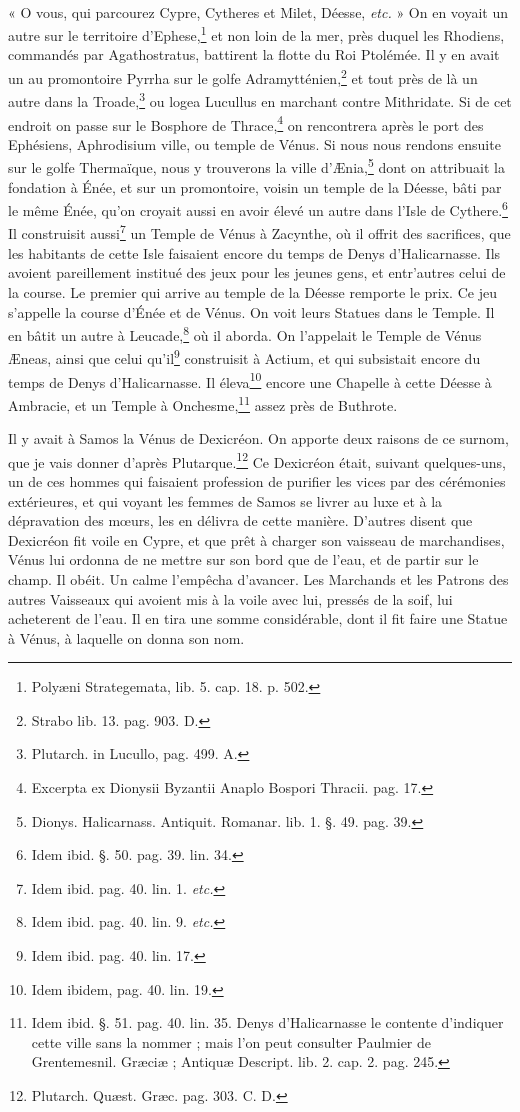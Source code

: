 \documentclass[a4paper, 18pt, oneside]{article}
\begin{document}
\paragraph{}
« O vous, qui parcourez Cypre, Cytheres et Milet, Déesse, \emph{etc.} » On en voyait un autre sur le territoire d'Ephese,\footnote{Polyæni Strategemata, lib. 5. cap. 18. p. 502.} et non loin de la mer, près duquel les Rhodiens, commandés par Agathostratus, battirent la flotte du Roi Ptolémée. Il y en avait un au promontoire Pyrrha sur le golfe Adramytténien,\footnote{Strabo lib. 13. pag. 903. D.} et tout près de là un autre dans la Troade,\footnote{Plutarch. in Lucullo, pag. 499. A.} ou logea Lucullus en marchant contre Mithridate. Si de cet endroit on passe sur le Bosphore de Thrace,\footnote{Excerpta ex Dionysii Byzantii Anaplo Bospori Thracii. pag. 17.} on rencontrera après le port des Ephésiens, Aphrodisium ville, ou temple de Vénus. Si nous nous rendons ensuite sur le golfe Thermaïque, nous y trouverons la ville d'Ænia,\footnote{Dionys. Halicarnass. Antiquit. Romanar. lib. 1. §. 49. pag. 39.} dont on attribuait la fondation à Énée, et sur un promontoire, voisin un temple de la Déesse, bâti par le même Énée, qu'on croyait aussi en avoir élevé un autre dans l'Isle de Cythere.\footnote{Idem ibid. §. 50. pag. 39. lin. 34.} Il construisit aussi\footnote{Idem ibid. pag. 40. lin. 1. \emph{etc.}} un Temple de Vénus à Zacynthe, où il offrit des sacrifices, que les habitants de cette Isle faisaient encore du temps de Denys d'Halicarnasse. Ils avoient pareillement institué des jeux pour les jeunes gens, et entr'autres celui de la course. Le premier qui arrive au temple de la Déesse remporte le prix. Ce jeu s'appelle la course d'Énée et de Vénus. On voit leurs Statues dans le Temple. Il en bâtit un autre à Leucade,\footnote{Idem ibid. pag. 40. lin. 9. \emph{etc.}} où il aborda. On l'appelait le Temple de Vénus Æneas, ainsi que celui qu'il\footnote{Idem ibid. pag. 40. lin. 17.} construisit à Actium, et qui subsistait encore du temps de Denys d'Halicarnasse. Il éleva\footnote{Idem ibidem, pag. 40. lin. 19.} encore une Chapelle à cette Déesse à Ambracie, et un Temple à Onchesme,\footnote{Idem ibid. §. 51. pag. 40. lin. 35. Denys d'Halicarnasse le contente d'indiquer cette ville sans la nommer ; mais l'on peut consulter Paulmier de Grentemesnil. Græciæ ; Antiquæ Descript. lib. 2. cap. 2. pag. 245.} assez près de Buthrote.

Il y avait à Samos la Vénus de Dexicréon. On apporte deux raisons de ce surnom, que je vais donner d'après Plutarque.\footnote{Plutarch. Quæst. Græc. pag. 303. C. D.} Ce Dexicréon était, suivant quelques-uns, un de ces hommes qui faisaient profession de purifier les vices par des cérémonies extérieures, et qui voyant les femmes de Samos se livrer au luxe et à la dépravation des mœurs, les en délivra de cette manière. D'autres disent que Dexicréon fit voile en Cypre, et que prêt à charger son vaisseau de marchandises, Vénus lui ordonna de ne mettre sur son bord que de l'eau, et de partir sur le champ. Il obéit. Un calme l'empêcha d'avancer. Les Marchands et les Patrons des autres Vaisseaux qui avoient mis à la voile avec lui, pressés de la soif, lui acheterent de l'eau. Il en tira une somme considérable, dont il fit faire une Statue à Vénus, à laquelle on donna son nom.
\end{document}
